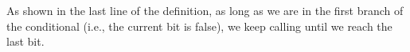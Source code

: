 As shown in the last line of the
definition, as long as we are in the first branch of the conditional
(i.e., the current bit is false), we keep calling  until
we reach the last bit.

  \begin{center}
  \resizebox{0.5\textwidth}{!}{}
  \end{center}












